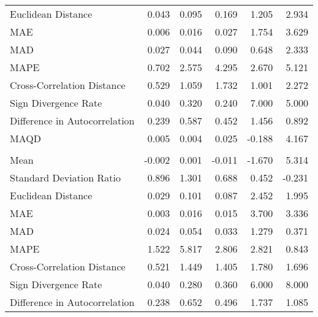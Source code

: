 \begin{landscape}
\begin{ThreePartTable}
\begin{longtable}[t]{lrrrrr}
\hspace{1em}Euclidean Distance & 0.043 & 0.095 & 0.169 & 1.205 & 2.934\\
\hspace{1em}MAE & 0.006 & 0.016 & 0.027 & 1.754 & 3.629\\
\hspace{1em}MAD & 0.027 & 0.044 & 0.090 & 0.648 & 2.333\\
\hspace{1em}MAPE & 0.702 & 2.575 & 4.295 & 2.670 & 5.121\\
\hspace{1em}Cross-Correlation Distance & 0.529 & 1.059 & 1.732 & 1.001 & 2.272\\
\hspace{1em}Sign Divergence Rate & 0.040 & 0.320 & 0.240 & 7.000 & 5.000\\
\hspace{1em}Difference in Autocorrelation & 0.239 & 0.587 & 0.452 & 1.456 & 0.892\\
\hspace{1em}MAQD & 0.005 & 0.004 & 0.025 & -0.188 & 4.167\\
\addlinespace[0.5em]
\multicolumn{6}{l}{\textbf{TUN}}\\
\hline
\hspace{1em}Mean & -0.002 & 0.001 & -0.011 & -1.670 & 5.314\\
\hspace{1em}Standard Deviation Ratio & 0.896 & 1.301 & 0.688 & 0.452 & -0.231\\
\hspace{1em}Euclidean Distance & 0.029 & 0.101 & 0.087 & 2.452 & 1.995\\
\hspace{1em}MAE & 0.003 & 0.016 & 0.015 & 3.700 & 3.336\\
\hspace{1em}MAD & 0.024 & 0.054 & 0.033 & 1.279 & 0.371\\
\hspace{1em}MAPE & 1.522 & 5.817 & 2.806 & 2.821 & 0.843\\
\hspace{1em}Cross-Correlation Distance & 0.521 & 1.449 & 1.405 & 1.780 & 1.696\\
\hspace{1em}Sign Divergence Rate & 0.040 & 0.280 & 0.360 & 6.000 & 8.000\\
\hspace{1em}Difference in Autocorrelation & 0.238 & 0.652 & 0.496 & 1.737 & 1.085\\

\end{longtable}
\end{ThreePartTable}
\end{landscape}
